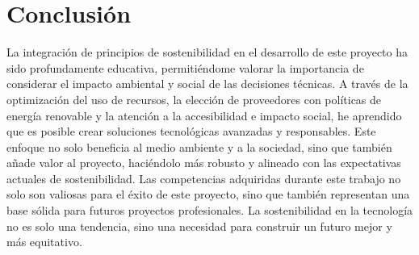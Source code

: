 \section{Conclusión}
La integración de principios de sostenibilidad en el desarrollo de este proyecto ha sido profundamente educativa, permitiéndome valorar la importancia de considerar el impacto ambiental y social de las decisiones técnicas. A través de la optimización del uso de recursos, la elección de proveedores con políticas de energía renovable y la atención a la accesibilidad e impacto social, he aprendido que es posible crear soluciones tecnológicas avanzadas y responsables. Este enfoque no solo beneficia al medio ambiente y a la sociedad, sino que también añade valor al proyecto, haciéndolo más robusto y alineado con las expectativas actuales de sostenibilidad. Las competencias adquiridas durante este trabajo no solo son valiosas para el éxito de este proyecto, sino que también representan una base sólida para futuros proyectos profesionales. La sostenibilidad en la tecnología no es solo una tendencia, sino una necesidad para construir un futuro mejor y más equitativo.